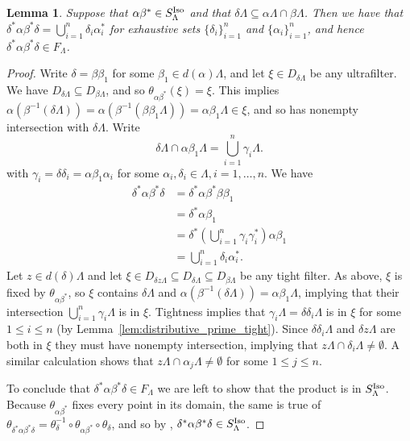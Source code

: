 \documentclass[12pt]{amsart}
\newtheorem{lemma}[thm]{Lemma}
\theoremstyle{definition}
\theoremstyle{remark}
\numberwithin{equation}{section}
\renewcommand{\L}{\Lambda}
\renewcommand{\a}{\alpha}
\renewcommand{\b}{\beta}
\newcommand{\Iso}{\textup{Iso}}
\newcommand{\de}{\delta}
\begin{document}
	
	\begin{lemma}\label{lem:Iso_to_core}
		Suppose that $\alpha\beta^*\in S_\L^\Iso$ and that $\de\L\subseteq \a\L \cap \b\L$.  Then we have that $\de^{*}\a\b^{*}\de = \bigcup_{i=1}^n \de_i\a_i^{*}$ for exhaustive sets  $\{\de_i\}_{i=1}^n$ and $\{\a_i\}_{i=1}^n$, and hence $\de^*\a\b^*\de\in F_\L$. 
	\end{lemma}
	\begin{proof}
		Write $\delta  = \beta\beta_1$ for some $\beta_1 \in d(\alpha)\L$, and let $\xi\in D_{\delta\L}$ be any ultrafilter. We have $D_{\delta\L}\subseteq D_{\beta\L}$, and so $\theta_{\a\b^*}(\xi) = \xi$. This implies $\alpha(\beta^{-1}(\delta\L)) = \alpha(\beta^{-1}(\beta\beta_1\L)) = \alpha\beta_1\L\in \xi$, and so has nonempty intersection with $\delta\L$.
		Write
			\[
			\delta\L \cap \alpha\beta_1\L = \bigcup_{i=1}^n\gamma_i\L.
			\]
			with $\gamma_i = \delta\delta_i = \alpha\beta_1\alpha_i$ for some $\alpha_i, \delta_i\in\L, i = 1, \dots, n$. We have
			\begin{align*}
				\de^*\a\b^*\de & = \de^*\a\b^*\b\b_1\\
				& = \de^*\a\b_1\\
				& = \de^*\left(\bigcup_{i=1}^n\gamma_i\gamma_i^*\right) \a\b_1\\
				&=\bigcup_{i=1}^n \de_i\a_i^*.
			\end{align*}
			Let $z\in d(\delta)\L$ and let $\xi\in D_{\delta z\L}\subseteq D_{\delta\L}\subseteq D_{\beta\L}$ be any tight filter. As above, $\xi$ is fixed by $\theta_{\a\b^*}$, so $\xi$ contains $\de\L$ and $\a(\b^{-1}(\de\L)) = \a\b_1\L$, implying that their intersection $\bigcup_{i=1}^n\gamma_i\L$ is in $\xi$. Tightness implies that $\gamma_i\L = \delta\delta_i\L$ is in $\xi$ for some $1\leq i\leq n$ (by Lemma~\ref{lem:distributive_prime_tight}). Since $\delta\delta_i\L$ and $\delta z\L$ are both in $\xi$ they must have nonempty intersection, implying that $z\L \cap \delta_i\L \neq\emptyset$. A similar calculation shows that $z\L\cap \alpha_j\L\neq \emptyset$ for some $1\leq j\leq n$.
			
			To conclude that $\de^*\a\b^*\de\in F_\L$ we are left to show that the product is in $S_\L^\Iso$. Because $\theta_{\a\b^*}$ fixes every point in its domain, the same is true of $\theta_{\de^*\a\b^*\de}= \theta_\de^{-1}\circ \theta_{\a\b^*}\circ\theta_\de$, and so by \cite[Lemma~4.9]{EP16}, $\de^*\a\b^*\de\in S^\Iso_\L$. 
	\end{proof}
	
\end{document}
